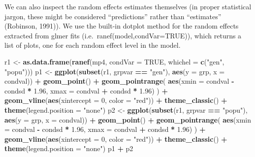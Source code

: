 \documentclass[
  12pt,
]{book}
\newenvironment{Shaded}{\begin{snugshade}}{\end{snugshade}}
\newcommand{\DataTypeTok}[1]{\textcolor[rgb]{0.13,0.29,0.53}{#1}}
\newcommand{\DecValTok}[1]{\textcolor[rgb]{0.00,0.00,0.81}{#1}}
\newcommand{\FloatTok}[1]{\textcolor[rgb]{0.00,0.00,0.81}{#1}}
\newcommand{\KeywordTok}[1]{\textcolor[rgb]{0.13,0.29,0.53}{\textbf{#1}}}
\newcommand{\NormalTok}[1]{#1}
\newcommand{\OperatorTok}[1]{\textcolor[rgb]{0.81,0.36,0.00}{\textbf{#1}}}
\newcommand{\OtherTok}[1]{\textcolor[rgb]{0.56,0.35,0.01}{#1}}
\newcommand{\StringTok}[1]{\textcolor[rgb]{0.31,0.60,0.02}{#1}}
\begin{document}
We can also inspect the random effects estimates themselves (in proper statistical jargon, these might be considered ``predictions'' rather than ``estimates'' (Robinson, 1991)). We use the built-in dotplot method for the random effects extracted from glmer fits (i.e.~ranef(model,condVar=TRUE)), which returns a list of plots, one for each random effect level in the model.

\begin{Shaded}
\begin{Highlighting}[]
\NormalTok{r1 \textless{}{-}}\StringTok{ }\KeywordTok{as.data.frame}\NormalTok{(}\KeywordTok{ranef}\NormalTok{(mp4, }\DataTypeTok{condVar =} \OtherTok{TRUE}\NormalTok{, }\DataTypeTok{whichel =} \KeywordTok{c}\NormalTok{(}\StringTok{"gen"}\NormalTok{, }\StringTok{"popu"}\NormalTok{)))}
\NormalTok{p1 \textless{}{-}}\StringTok{ }\KeywordTok{ggplot}\NormalTok{(}\KeywordTok{subset}\NormalTok{(r1, grpvar }\OperatorTok{==}\StringTok{ "gen"}\NormalTok{), }\KeywordTok{aes}\NormalTok{(}\DataTypeTok{y =}\NormalTok{ grp, }\DataTypeTok{x =}\NormalTok{ condval)) }\OperatorTok{+}
\StringTok{  }\KeywordTok{geom\_point}\NormalTok{() }\OperatorTok{+}
\StringTok{  }\KeywordTok{geom\_pointrange}\NormalTok{(}
    \KeywordTok{aes}\NormalTok{(}\DataTypeTok{xmin =}\NormalTok{ condval }\OperatorTok{{-}}\StringTok{ }\NormalTok{condsd }\OperatorTok{*}\StringTok{ }\FloatTok{1.96}\NormalTok{, }\DataTypeTok{xmax =}\NormalTok{ condval }\OperatorTok{+}\StringTok{ }\NormalTok{condsd }\OperatorTok{*}\StringTok{ }\FloatTok{1.96}\NormalTok{)}
\NormalTok{  ) }\OperatorTok{+}
\StringTok{  }\KeywordTok{geom\_vline}\NormalTok{(}\KeywordTok{aes}\NormalTok{(}\DataTypeTok{xintercept =} \DecValTok{0}\NormalTok{, }\DataTypeTok{color =} \StringTok{"red"}\NormalTok{)) }\OperatorTok{+}
\StringTok{  }\KeywordTok{theme\_classic}\NormalTok{() }\OperatorTok{+}
\StringTok{  }\KeywordTok{theme}\NormalTok{(}\DataTypeTok{legend.position =} \StringTok{"none"}\NormalTok{)}
\NormalTok{p2 \textless{}{-}}\StringTok{ }\KeywordTok{ggplot}\NormalTok{(}\KeywordTok{subset}\NormalTok{(r1, grpvar }\OperatorTok{==}\StringTok{ "popu"}\NormalTok{), }\KeywordTok{aes}\NormalTok{(}\DataTypeTok{y =}\NormalTok{ grp, }\DataTypeTok{x =}\NormalTok{ condval)) }\OperatorTok{+}
\StringTok{  }\KeywordTok{geom\_point}\NormalTok{() }\OperatorTok{+}
\StringTok{  }\KeywordTok{geom\_pointrange}\NormalTok{(}
    \KeywordTok{aes}\NormalTok{(}\DataTypeTok{xmin =}\NormalTok{ condval }\OperatorTok{{-}}\StringTok{ }\NormalTok{condsd }\OperatorTok{*}\StringTok{ }\FloatTok{1.96}\NormalTok{, }\DataTypeTok{xmax =}\NormalTok{ condval }\OperatorTok{+}\StringTok{ }\NormalTok{condsd }\OperatorTok{*}\StringTok{ }\FloatTok{1.96}\NormalTok{)}
\NormalTok{  ) }\OperatorTok{+}
\StringTok{  }\KeywordTok{geom\_vline}\NormalTok{(}\KeywordTok{aes}\NormalTok{(}\DataTypeTok{xintercept =} \DecValTok{0}\NormalTok{, }\DataTypeTok{color =} \StringTok{"red"}\NormalTok{)) }\OperatorTok{+}
\StringTok{  }\KeywordTok{theme\_classic}\NormalTok{() }\OperatorTok{+}
\StringTok{  }\KeywordTok{theme}\NormalTok{(}\DataTypeTok{legend.position =} \StringTok{"none"}\NormalTok{)}
\NormalTok{p1 }\OperatorTok{+}\StringTok{ }\NormalTok{p2}
\end{Highlighting}
\end{Shaded}
\end{document}
